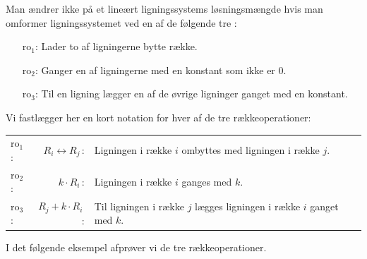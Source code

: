 \begin{theorem}[Rækkeoperationer]\label{TN2.6}
Man ændrer ikke på et lineært ligningssystems løsnings\-mængde hvis man omformer ligningssystemet ved en af de følgende tre :
\begin{enumerate}
\item[ro$_1$:] Lader to af ligningerne bytte række.
\item[ro$_2$:] Ganger en af ligningerne med en konstant som ikke er $0$.
\item[ro$_3$:] Til en ligning lægger en af de øvrige ligninger ganget med en konstant.
\end{enumerate}
\end{theorem}

\begin{info}%
Vi fastlægger her en kort notation for hver af de tre rækkeoperationer: \medskip \\
\begin{tabular}{lrl}
ro$_1$:& $R_i\leftrightarrow R_j\,$:& Ligningen i række $i$ ombyttes med ligningen i række $j$.\medskip \\ 
ro$_2$:&$k\cdot R_i\,$:& Ligningen i række $i$ ganges med $k$.\medskip \\ 
ro$_3$:&$R_j+k\cdot R_i\,$:& Til ligningen i række $j$ lægges ligningen i række $i$ ganget med $k$.
\end{tabular}
\end{info}

I det følgende eksempel afprøver vi de tre rækkeoperationer.

